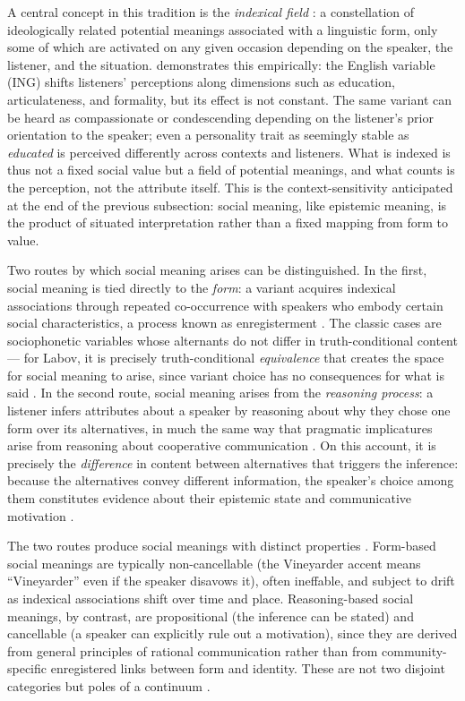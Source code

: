 \documentclass[12pt,a4paper]{article}
\begin{document}
A central concept in this tradition is the \emph{indexical field}
\citep{Eckert2008,Silverstein2003}: a constellation of ideologically related
potential meanings associated with a linguistic form, only some of which are
activated on any given occasion depending on the speaker, the listener, and the
situation. \citet{campbellkibler2007} demonstrates this empirically: the English
variable (ING) shifts listeners' perceptions along dimensions such as education,
articulateness, and formality, but its effect is not constant. The same variant
can be heard as compassionate or condescending depending on the listener's prior
orientation to the speaker; even a personality trait as seemingly stable as
\emph{educated} is perceived differently across contexts and listeners.
What is indexed is thus not a fixed social value but a field of potential
meanings, and what counts is the perception, not the attribute itself. This
is the context-sensitivity anticipated at the end of the previous subsection:
social meaning, like epistemic meaning, is the product of situated interpretation
rather than a fixed mapping from form to value.

Two routes by which social meaning arises can be distinguished. In the first,
social meaning is tied directly to the \emph{form}: a variant acquires indexical
associations through repeated co-occurrence with speakers who embody certain
social characteristics, a process known as enregisterment
\citep{agha2003,campbellkibler2007}. The classic cases are sociophonetic
variables whose alternants do not differ in truth-conditional content ---
for Labov, it is precisely truth-conditional \emph{equivalence} that creates
the space for social meaning to arise, since variant choice has no consequences
for what is said \citep{terkourafi2026}. In the second route, social meaning
arises from the \emph{reasoning process}: a listener infers attributes about a
speaker by reasoning about why they chose one form over its alternatives, in
much the same way that pragmatic implicatures arise from reasoning about
cooperative communication \citep{Acton2019,beltramapapafragou2023,soltEtAl2025}.
On this account, it is precisely the \emph{difference} in content between
alternatives that triggers the inference: because the alternatives convey
different information, the speaker's choice among them constitutes evidence about
their epistemic state and communicative motivation \citep{terkourafi2026}.

The two routes produce social meanings with distinct properties
\citep{terkourafi2026,burnett2026}. Form-based social meanings are typically
non-cancellable (the Vineyarder accent means ``Vineyarder'' even if the speaker
disavows it), often ineffable, and subject to drift as indexical associations
shift over time and place. 
Reasoning-based social meanings, by contrast, are propositional (the inference
can be stated) and cancellable (a speaker can explicitly rule out a motivation),
since they are derived from general principles of rational communication rather
than from community-specific enregistered links between form and identity.
These are not two disjoint categories but poles of a continuum \citep{Eckert2019}.
\end{document}
